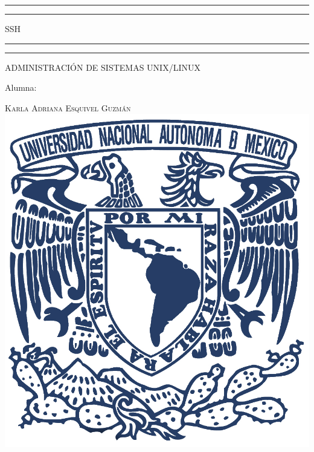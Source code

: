 \documentclass[a4paper, 11pt, oneside]{article}
\begin{document}
 

\begin{titlepage} 

	\centering 
	
	\scshape 
	
	\vspace*{\baselineskip} 
	
	
	
	\rule{\textwidth}{1.6pt}\vspace*{-\baselineskip}\vspace*{2pt} 
	\rule{\textwidth}{0.4pt} 
	
	\vspace{0.75\baselineskip} 
	
	{\LARGE SSH}	
	\vspace{0.75\baselineskip} 
	
	\rule{\textwidth}{0.4pt}\vspace*{-\baselineskip}\vspace{3.2pt}
	\rule{\textwidth}{1.6pt} 
	
	\vspace{2\baselineskip} 
	

	ADMINISTRACIÓN DE SISTEMAS UNIX/LINUX
	
	\vspace*{3\baselineskip} 
	
	
	
	Alumna:
	
	\vspace{0.5\baselineskip} 
	
	{\scshape\Large Karla Adriana Esquivel Guzmán \\} 
	\vspace{0.5\baselineskip} 
	\vfill
	\includegraphics{unam.jpg}
	

\end{titlepage}
\end{document}

